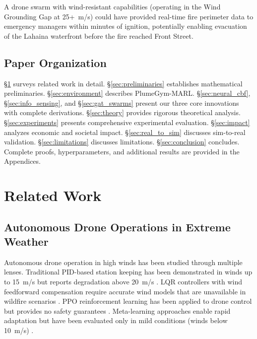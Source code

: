 \documentclass[12pt,a4paper]{article}
\begin{document}
A drone swarm with wind-resistant capabilities (operating in the Wind Grounding Gap at 25+~m/s) could have provided real-time fire perimeter data to emergency managers within minutes of ignition, potentially enabling evacuation of the Lahaina waterfront before the fire reached Front Street.

\subsection{Paper Organization}
\S\ref{sec:related} surveys related work in detail. \S\ref{sec:preliminaries} establishes mathematical preliminaries. \S\ref{sec:environment} describes PlumeGym-MARL. \S\ref{sec:neural_cbf}, \S\ref{sec:info_sensing}, and \S\ref{sec:gat_swarms} present our three core innovations with complete derivations. \S\ref{sec:theory} provides rigorous theoretical analysis. \S\ref{sec:experiments} presents comprehensive experimental evaluation. \S\ref{sec:impact} analyzes economic and societal impact. \S\ref{sec:real_to_sim} discusses sim-to-real validation. \S\ref{sec:limitations} discusses limitations. \S\ref{sec:conclusion} concludes. Complete proofs, hyperparameters, and additional results are provided in the Appendices.


\section{Related Work}
\label{sec:related}

\subsection{Autonomous Drone Operations in Extreme Weather}

Autonomous drone operation in high winds has been studied through multiple lenses. Traditional PID-based station keeping has been demonstrated in winds up to 15~m/s but reports degradation above 20~m/s \cite{Abichandani2019}. LQR controllers with wind feedforward compensation require accurate wind models that are unavailable in wildfire scenarios \cite{Duggal2020}. PPO reinforcement learning has been applied to drone control but provides no safety guarantees \cite{PPO2017}. Meta-learning approaches enable rapid adaptation but have been evaluated only in mild conditions (winds below 10~m/s) \cite{Peng2021}.
\end{document}
